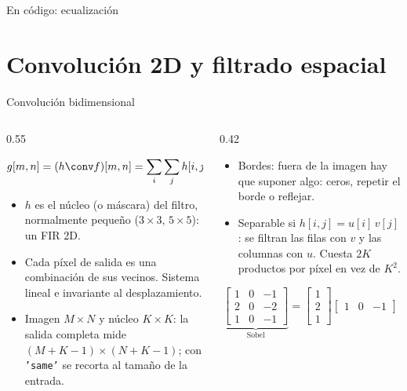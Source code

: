 \documentclass[aspectratio=169,11pt]{beamer}
\begin{document}
\begin{frame}{En código: ecualización}
\end{frame}

\section{Convolución 2D y filtrado espacial}

\begin{frame}{Convolución bidimensional}
  \begin{columns}[c]
    \begin{column}{0.55\textwidth}
      \small
      \begin{definicion}[Convolución 2D]
        \[
          g[m,n]=(h\conv f)[m,n]=\sum_{i}\sum_{j}h[i,j]\,f[m-i,n-j]
        \]
      \end{definicion}
      \begin{itemize}
        \item $h$ es el \alert{núcleo} (o máscara) del filtro, normalmente pequeño ($3\times3$, $5\times5$): un FIR 2D.
        \item Cada píxel de salida es una combinación de sus vecinos. Sistema lineal e invariante al desplazamiento.
        \item Imagen $M\times N$ y núcleo $K\times K$: la salida completa mide $(M+K-1)\times(N+K-1)$; con \texttt{'same'} se recorta al tamaño de la entrada.
      \end{itemize}
    \end{column}
    \begin{column}{0.42\textwidth}
      \small
      \begin{itemize}
        \item \alert{Bordes}: fuera de la imagen hay que suponer algo: ceros, repetir el borde o reflejar.
        \item \alert{Separable} si $h[i,j]=u[i]\,v[j]$: se filtran las filas con $v$ y las columnas con $u$. Cuesta $2K$ productos por píxel en vez de $K^2$.
      \end{itemize}
      \[
        \underbrace{\begin{bmatrix}1&0&-1\\2&0&-2\\1&0&-1\end{bmatrix}}_{\text{Sobel}}=\begin{bmatrix}1\\2\\1\end{bmatrix}\begin{bmatrix}1&0&-1\end{bmatrix}
      \]
    \end{column}
  \end{columns}
\end{frame}
\end{document}
